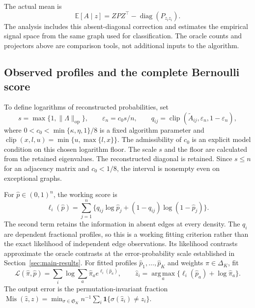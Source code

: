\documentclass[11pt]{article}
\theoremstyle{definition}
\theoremstyle{remark}
\newcommand{\Mis}{\operatorname{Mis}}
\newcommand{\E}{\mathbb E}
\newcommand{\one}{\mathbf 1}
\newcommand{\argmax}{\operatorname*{arg\,max}}
\numberwithin{equation}{section}
\begin{document}
The actual mean is
\begin{equation}
 \E[A\mid z]=ZPZ^\top-\operatorname{diag}(P_{z_i z_i}).
 \label{eq:mean}
\end{equation}
The analysis includes this absent-diagonal correction and estimates the empirical signal space from the same graph used for classification. The oracle counts and projectors above are comparison tools, not additional inputs to the algorithm.

\subsection{Observed profiles and the complete Bernoulli score}
To define logarithms of reconstructed probabilities, set
\begin{equation}
 s=\max\{1,\|\Lambda\|_{\mathrm{op}}\},\qquad
 \varepsilon_n=c_0s/n,\qquad
 q_{ij}=\operatorname{clip}(\widetilde A_{ij},\varepsilon_n,1-\varepsilon_n),
 \label{eq:profiles}
\end{equation}
where $0<c_0<\min\{\kappa,\eta,1\}/8$ is a fixed algorithm parameter and $\operatorname{clip}(x,l,u)=\min\{u,\max\{l,x\}\}$. The admissibility of $c_0$ is an explicit model condition on this chosen logarithm floor. The scale $s$ and the floor are calculated from the retained eigenvalues. The reconstructed diagonal is retained. Since $s\le n$ for an adjacency matrix and $c_0<1/8$, the interval is nonempty even on exceptional graphs.

For $\widehat p\in(0,1)^n$, the working score is
\begin{equation}
 \ell_i(\widehat p)
 =\sum_{j=1}^n\{q_{ij}\log\widehat p_j
           +(1-q_{ij})\log(1-\widehat p_j)\}.
 \label{eq:working-score}
\end{equation}
The second term retains the information in absent edges at every density. The $q_i$ are dependent fractional profiles, so this is a working fitting criterion rather than the exact likelihood of independent edge observations. Its likelihood contrasts approximate the oracle contrasts at the error-probability scale established in Section~\ref{sec:main-results}.
For fitted profiles $\widehat p_1,\ldots,\widehat p_K$ and weights $\widehat\pi\in\Delta_K$, fit
\begin{equation}
 \mathcal L(\widehat\pi,\widehat p)
 =\sum_i\log\sum_a\widehat\pi_a e^{\ell_i(\widehat p_a)},\qquad
 \widehat z_i=\argmax_a\{\ell_i(\widehat p_a)+\log\widehat\pi_a\}.
 \label{eq:mixture-and-decode}
\end{equation}
The output error is the permutation-invariant fraction
$\Mis(\widehat z,z)=\min_{\sigma\in\mathfrak S_K}n^{-1}\sum_i\one\{\sigma(\widehat z_i)\ne z_i\}$.
\end{document}
